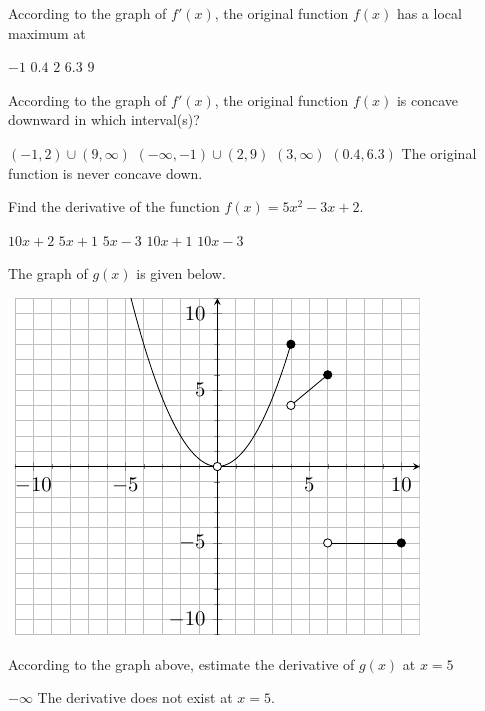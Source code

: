 \documentclass[11pt]{article}
\begin{document}
\begin{questions}
\begin{multiplechoice}{5}

\question According to the graph of $f'(x)$, the original function $f(x)$ has a local maximum at
\begin{answers}{3}
\ans $-1$
\ans $0.4$
\ans $2$
\ans $6.3$
\ans $9$
\end{answers}


\question According to the graph of $f'(x)$, the original function $f(x)$ is concave downward in which interval(s)?
\begin{answers}{3}
\ans $(-1,2) \cup (9, \infty)$
\ans $(-\infty, -1) \cup (2,9)$
\ans $(3, \infty)$
\ans $(0.4,6.3)$
\ans The original function is never concave down.
\end{answers}


\question Find the derivative of the function $f(x) = 5x^2 - 3x + 2$.
\begin{answers}{2}
\ans $10x + 2$
\ans $5x + 1$
\ans $ 5x -3$
\ans $10x +1$
\ans $10x - 3$
\end{answers}

\newpage

\question The graph of $g(x)$ is given below.\\

\begin{minipage}{\linewidth}%
\centering
\makebox[\linewidth]{}
\includegraphics{exam2graph2.pdf}
\label{graph2exam1}%
\end{minipage}
\question According to the graph above, estimate the derivative of $g(x)$ at $x = 5$
\begin{answers}{2}
\ans $-\infty$
\ans The derivative does not exist at $x=5$.
\end{answers}


\end{multiplechoice}
\end{questions}
\end{document}
